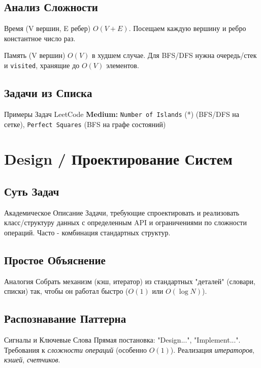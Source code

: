 \subsection{Анализ Сложности}
\begin{myblock}{Время {(V вершин, E ребер)}}
    $O(V + E)$. Посещаем каждую вершину и ребро константное число раз.
\end{myblock}
\begin{myblock}{Память {(V вершин)}}
    $O(V)$ в худшем случае. Для BFS/DFS нужна очередь/стек и \texttt{visited}, хранящие до $O(V)$ элементов.
\end{myblock}

\subsection{Задачи из Списка}
\begin{myblock}{Примеры Задач LeetCode}
    \textbf{Medium:} \texttt{Number of Islands} (*) (BFS/DFS на сетке), \texttt{Perfect Squares} (BFS на графе состояний)
\end{myblock}

\section{Design / Проектирование Систем}

\subsection{Суть Задач}
\begin{myblock}{Академическое Описание}
    Задачи, требующие спроектировать и реализовать класс/структуру данных с определенным API и ограничениями по сложности операций. Часто - комбинация стандартных структур.
\end{myblock}

\subsection{Простое Объяснение}
\begin{myblock}{Аналогия}
    Собрать механизм (кэш, итератор) из стандартных "деталей" (словари, списки) так, чтобы он работал быстро ($O(1)$ или $O(\log N)$).
\end{myblock}

\subsection{Распознавание Паттерна}
\begin{myblock}{Сигналы и Ключевые Слова}
    Прямая постановка: "Design...", "Implement...". Требования к \emph{сложности операций} (особенно $O(1)$). Реализация \emph{итераторов}, \emph{кэшей}, \emph{счетчиков}.
\end{myblock}

